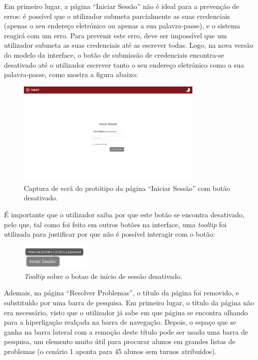 \documentclass[12pt, a4paper]{article}
\begin{document}
Em primeiro lugar, a página ``Iniciar Sessão'' não é ideal para a prevenção de erros: é possível que
o utilizador submeta parcialmente as suas credenciais (apenas o seu endereço eletrónico ou apenas a
sua palavra-passe), e o sistema reagirá com um erro. Para prevenir este erro, deve ser impossível
que um utilizador submeta as suas credenciais até as escrever todas. Logo, na nova versão do modelo
da interface, o botão de submissão de credenciais encontra-se desativado até o utilizador escrever
tanto o seu endereço eletrónico como a sua palavra-passe, como mostra a figura abaixo:

\begin{figure}[H]
    \centering
    \includegraphics[width=0.8\textwidth]{res/prototype/iniciar-sessao-botao-desativado-email.png}
    \caption{Captura de ecrã do protótipo da página ``Iniciar Sessão'' com botão desativado.}
    \label{iniciar-sessao-botao-desativado-email}
\end{figure}


É importante que o utilizador saiba por que este botão se encontra desativado, pelo que, tal como
foi feito em outros botões na interface, uma \emph{tooltip} foi utilizada para justificar por que
não é possível interagir com o botão:

\begin{figure}[H]
    \centering
    \includegraphics[width=0.3\textwidth]{res/prototype/inicar-sessao-tooltip-botao-desativado.png}
    \caption{\emph{Tooltip} sobre o botao de início de sessão desativado.}
    \label{inicar-sessao-tooltip-botao-desativado}
\end{figure}

Ademais, na página ``Resolver Problemas'', o título da página foi removido, e substituído por uma
barra de pesquisa. Em primeiro lugar, o título da página não era necessário, visto que o utilizador
já sabe em que página se encontra olhando para a hiperligação realçada na barra de navegação.
Depois, o espaço que se ganha na barra lateral com a remoção deste título pode ser usado uma barra
de pesquisa, um elemento muito útil para procurar alunos em grandes listas de problemas (o cenário 1
aponta para 45 alunos sem turnos atribuídos).
\end{document}
